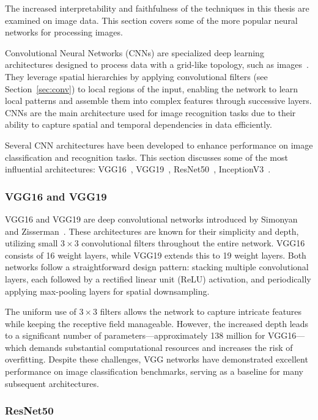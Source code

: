 The increased interpretability and faithfulness of the techniques in this thesis are examined on image data. This section covers some of the more popular neural networks for processing images.

Convolutional Neural Networks (CNNs) are specialized deep learning architectures designed to process data with a grid-like topology, such as images~\cite{726791}. They leverage spatial hierarchies by applying convolutional filters (see Section~\ref{sec:conv}) to local regions of the input, enabling the network to learn local patterns and assemble them into complex features through successive layers. CNNs are the main architecture used for image recognition tasks due to their ability to capture spatial and temporal dependencies in data efficiently.

Several CNN architectures have been developed to enhance performance on image classification and recognition tasks. This section discusses some of the most influential architectures: VGG16~\cite{SimonyanZ14a}, VGG19~\cite{SimonyanZ14a}, ResNet50~\cite{he2015deep}, InceptionV3~\cite{szegedy2015rethinking}. 

\subsubsection{VGG16 and VGG19}

VGG16 and VGG19 are deep convolutional networks introduced by Simonyan and Zisserman~\cite{SimonyanZ14a}. These architectures are known for their simplicity and depth, utilizing small $3 \times 3$ convolutional filters throughout the entire network. VGG16 consists of 16 weight layers, while VGG19 extends this to 19 weight layers. Both networks follow a straightforward design pattern: stacking multiple convolutional layers, each followed by a rectified linear unit (ReLU) activation, and periodically applying max-pooling layers for spatial downsampling.

The uniform use of $3 \times 3$ filters allows the network to capture intricate features while keeping the receptive field manageable. However, the increased depth leads to a significant number of parameters—approximately 138 million for VGG16—which demands substantial computational resources and increases the risk of overfitting. Despite these challenges, VGG networks have demonstrated excellent performance on image classification benchmarks, serving as a baseline for many subsequent architectures.

\subsubsection{ResNet50}

